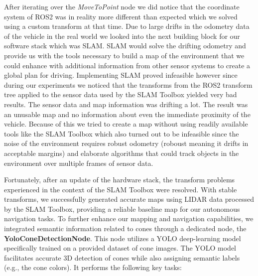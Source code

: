 After iterating over the \textit{MoveToPoint} node we did notice that the coordinate system of ROS2 was in reality more different than expected which we solved using a custom transform at that time. Due to large drifts in the odometry data of the vehicle in the real world we looked into the next building block for our software stack which was SLAM. SLAM would solve the drifting odometry and provide us with the tools necessary to build a map of the environment that we could enhance with additional information from other sensor systems to create a global plan for driving. Implementing SLAM proved infeasible however since during our experiments we noticed that the transforms from the ROS2 transform tree applied to the sensor data used by the SLAM Toolbox yielded very bad results. The sensor data and map information was drifting a lot. The result was an unusable map and no information about even the immediate proximity of the vehicle. Because of this we tried to create a map without using readily available tools like the SLAM Toolbox which also turned out to be infeasible since the noise of the environment requires robust odometry (roboust meaning it drifts in acceptable margins) and elaborate algorithms that could track objects in the environment over multiple frames of sensor data.

Fortunately, after an update of the hardware stack, the transform problems experienced in the context of the SLAM Toolbox were resolved. With stable transforms, we successfully generated accurate maps using LIDAR data processed by the SLAM Toolbox, providing a reliable baseline map for our autonomous navigation tasks.
To further enhance our mapping and navigation capabilities, we integrated semantic information related to cones through a dedicated node, the \textbf{YoloConeDetectionNode}. This node utilizes a YOLO deep-learning model specifically trained on a provided dataset of cone images. The YOLO model facilitates accurate 3D detection of cones while also assigning semantic labels (e.g., the cone colors).
It performs the following key tasks:

